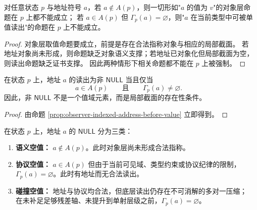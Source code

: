 \begin{proposition}[地址先于取值]\label{prop:observer-indexed-address-before-value}
对任意状态 \(p\) 与地址符号 \(a\)，若 \(a\notin A(p)\)，则一切形如"\(a\) 的值为 \(v\)"的对象层命题在 \(p\) 上都不能成立；
若 \(a\in A(p)\) 但 \(\Gamma_p(a)=\varnothing\)，则"\(a\) 在当前类型中可被单值读出"的命题在 \(p\) 上不能成立。
\end{proposition}

\begin{proof}
对象层取值命题要成立，前提是存在合法指称对象与相应的局部截面。
若地址对象尚未形成，则命题缺乏对象语义支撑；若地址已对象化但局部截面为空，则读出命题缺乏证书支撑。
因此两种情形下相关命题都不能在 \(p\) 上被强制。
\end{proof}

\begin{corollary}\label{cor:observer-indexed-nonnull-criterion}
在状态 \(p\) 上，地址 \(a\) 的读出为非 \(\mathsf{NULL}\) 当且仅当
\[
a\in A(p)
\qquad\text{且}\qquad
\Gamma_p(a)\neq \varnothing.
\]
因此，非 \(\mathsf{NULL}\) 不是一个值域元素，而是局部截面的存在性条件。
\end{corollary}

\begin{proof}
由命题 \ref{prop:observer-indexed-address-before-value} 立即得到。
\end{proof}

\begin{definition}\label{def:observer-indexed-null-trichotomy}
在状态 \(p\) 上，地址 \(a\) 的 \(\mathsf{NULL}\) 分为三类：
\begin{enumerate}
  \item \textbf{语义空值：} \(a\notin A(p)\)。此时对象层尚未形成合法指称。
  \item \textbf{协议空值：} \(a\in A(p)\) 但由于当前可见域、类型约束或协议纪律的限制，\(\Gamma_p(a)=\varnothing\)。此时有地址而无合法读出。
  \item \textbf{碰撞空值：} 地址与协议均合法，但底层读出仍存在不可消解的多对一压缩；在未补足足够残差轴、未提升到单射层级之前，\(\Gamma_p(a)=\varnothing\)。
\end{enumerate}
\end{definition}

